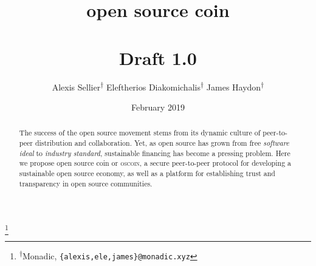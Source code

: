 \documentclass[a4paper, oneside, 10pt, final]{amsart}
\begin{document}
\title[open source coin]{open source coin \\ \vspace{0.5em} \\ {\tiny Draft 1.0}}
\author{\Small Alexis Sellier\textsuperscript{$\dagger$} \qquad Eleftherios Diakomichalis\textsuperscript{$\dagger$} \qquad James Haydon\textsuperscript{$\dagger$}}
\date{February 2019}

\thanks{\textsuperscript{$\dagger$}Monadic, \texttt{\{alexis,ele,james\}@monadic.xyz}}

\begin{abstract}
The success of the open source movement stems from its dynamic culture of
peer-to-peer distribution and collaboration. Yet, as open source has grown from
free \emph{software ideal} to \emph{industry standard}, sustainable financing
has become a pressing problem.  Here we propose open source coin or
\textsc{oscoin}, a secure peer-to-peer protocol for developing a sustainable
open source economy, as well as a platform for establishing trust and
transparency in open source communities.
\end{abstract}

\maketitle
\end{document}
